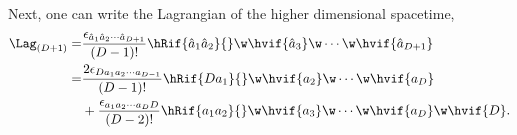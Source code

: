 Next, one can write the Lagrangian of the higher dimensional spacetime,
\begin{align}
  \Lag_{(D+1)} =& \frac{\epsilon_{\hat{a}_1\hat{a}_2\cdots\hat{a}_{D+1}}}{(D-1)!}\hRif{\hat{a}_1\hat{a}_2}{}\w\hvif{\hat{a}_3}\w\cdots\w\hvif{\hat{a}_{D+1}}\\
  =& \frac{2 \epsilon_{D a_1 a_2\cdots a_{D-1}}}{(D-1)!}\hRif{D{a}_1}{}\w\hvif{{a}_2}\w\cdots\w\hvif{{a}_{D}}\notag\\
  &+ \frac{\epsilon_{a_1 a_2\cdots a_{D}D}}{(D-2)!}\hRif{{a}_1{a}_2}{}\w\hvif{{a}_3}\w\cdots\w\hvif{{a}_{D}}\w\hvif{D}.
\end{align}

